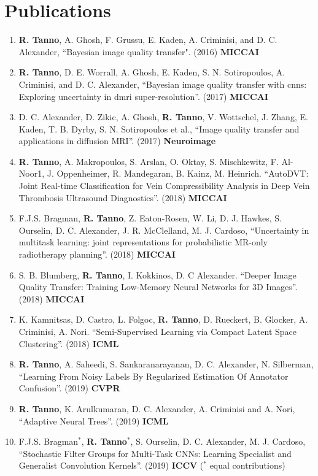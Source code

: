 \section*{Publications}
\small
\begin{enumerate}
	\item \textbf{R. Tanno}, A. Ghosh, F. Grussu, E. Kaden, A. Criminisi, and D. C. Alexander, “Bayesian image quality transfer". (2016) \textbf{MICCAI}
	
	\item \textbf{R. Tanno}, D. E. Worrall, A. Ghosh, E. Kaden, S. N. Sotiropoulos, A. Criminisi, and D. C. Alexander, “Bayesian image quality transfer with cnns: Exploring uncertainty in dmri super-resolution”. (2017) \textbf{MICCAI}
		
	\item D. C. Alexander, D. Zikic, A. Ghosh, \textbf{R. Tanno}, V. Wottschel, J. Zhang, E. Kaden, T. B. Dyrby, S. N. Sotiropoulos et al., “Image quality transfer and applications in diffusion MRI”.  (2017) \textbf{Neuroimage}
	
	\item \textbf{R. Tanno}, A. Makropoulos, S. Arslan, O. Oktay, S. Mischkewitz, F. Al-Noor1, J. Oppenheimer, R. Mandegaran, B. Kainz, M. Heinrich. ``AutoDVT: Joint Real-time Classification for Vein Compressibility Analysis in Deep Vein Thrombosis Ultrasound Diagnostics''. (2018) \textbf{MICCAI}
	
	\item F.J.S. Bragman, \textbf{R. Tanno}, Z. Eaton-Rosen, W. Li, D. J. Hawkes, S. Ourselin, D. C. Alexander, J. R. McClelland, M. J. Cardoso, ``Uncertainty in multitask learning: joint representations for probabilistic MR-only radiotherapy planning''. (2018) \textbf{MICCAI}
	
	\item S. B. Blumberg, \textbf{R. Tanno}, I. Kokkinos, D. C Alexander. ``Deeper Image Quality Transfer: Training Low-Memory Neural Networks for 3D Images''. (2018) \textbf{MICCAI }
	
	\item K. Kamnitsas, D. Castro, L. Folgoc, \textbf{R. Tanno}, D. Rueckert, B. Glocker, A. Criminisi, A. Nori. ``Semi-Supervised Learning via Compact Latent Space Clustering''. (2018) \textbf{ICML}
	
	\item \textbf{R. Tanno}, A. Saheedi, S. Sankaranarayanan, D. C. Alexander, N. Silberman, ``Learning From Noisy Labels By Regularized Estimation Of Annotator Confusion''.  (2019) \textbf{CVPR}
	\item \textbf{R. Tanno}, K. Arulkumaran, D. C. Alexander, A. Criminisi and A. Nori,  “Adaptive Neural Trees”.  (2019) \textbf{ICML }
	\item F.J.S. Bragman$^*$, \textbf{R. Tanno}$^*$, S. Ourselin, D. C. Alexander, M. J. Cardoso, ``Stochastic Filter Groups for Multi-Task CNNs: Learning Specialist and Generalist Convolution Kernels''.  (2019) \textbf{ICCV} ($^*$ equal contributions)
	

\end{enumerate}

